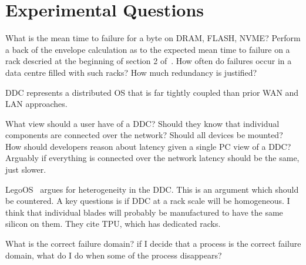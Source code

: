 


\section{Experimental Questions}
\label{sec:experiment}

What is the mean time to failure for a byte on DRAM, FLASH, NVME? Perform a
back of the envelope calculation as to the expected mean time to failure on a
rack descried at the beginning of section 2 of~\cite{189914}. How often do
failures occur in a data centre filled with such racks? How much redundancy is
justified?

DDC represents a distributed OS that is far tightly coupled than prior WAN and
LAN approaches.

What view should a user have of a DDC? Should they know that individual
components are connected over the network? Should all devices be mounted? How
should developers reason about latency given a single PC view of a DDC?
Arguably if everything is connected over the network latency should be the
same, just slower.

LegoOS~\cite{legoos} argues for heterogeneity in the DDC. This is an argument
which should be countered. A key questions is if DDC at a rack scale will be
homogeneous. I think that individual blades will probably be manufactured to
have the same silicon on them. They cite TPU, which has dedicated racks.

What is the correct failure domain? if I decide that a process is the correct
failure domain, what do I do when some of the process disappears? 

